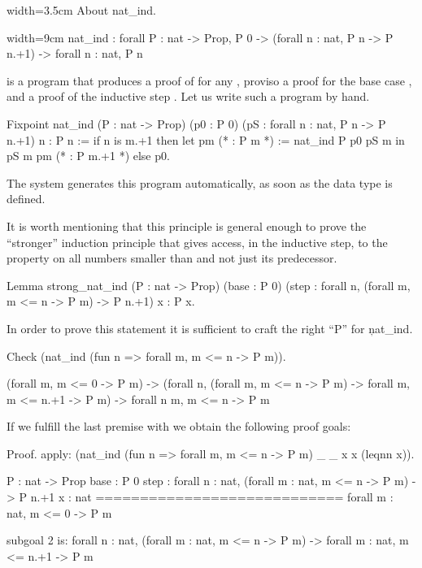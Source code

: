 \begin{coq}{}{width=3.5cm}
About nat_ind.
\end{coq}
\begin{coqout}{}{width=9cm}
nat_ind : forall P : nat -> Prop,
  P 0 -> (forall n : nat, P n -> P n.+1) -> forall n : nat, P n
\end{coqout}
 is a program that produces a proof of  for any ,
proviso a proof for the base case , and a proof
of the inductive step .
Let us write such a program by hand.

\begin{coq}{}{}
Fixpoint nat_ind (P : nat -> Prop)
  (p0 : P 0) (pS : forall n : nat, P n -> P n.+1) n : P n :=
  if n is m.+1 then
    let pm (* : P m *) := nat_ind P p0 pS m in
    pS m pm (* : P m.+1 *)
  else p0.
\end{coq}

The \Coq{} system generates this program automatically, as soon as
 the  data type
is defined. 

It is worth mentioning that this principle is general enough to
prove the ``stronger'' induction principle that gives access, in
the inductive step, to the property  on all numbers
smaller than  and not just its predecessor.

\begin{coq}{}{}
Lemma strong_nat_ind (P : nat -> Prop)
  (base : P 0)
  (step : forall n, (forall m, m <= n -> P m) -> P n.+1) x : P x.
\end{coq}{}{}

In order to prove this statement it is sufficient to craft
the right ``P'' for \c{nat_ind}.

\begin{coq}{}{}
Check (nat_ind (fun n => forall m, m <= n -> P m)).
\end{coq}{}{}
\begin{coqout}{}{}
  (forall m, m <= 0 -> P m) ->
  (forall n, (forall m, m <= n -> P m) -> forall m, m <= n.+1 -> P m) ->
  forall n m, m <= n -> P m
\end{coqout}{}{}

If we fulfill the last premise with  we obtain
the following proof goals:

\begin{coq}{}{}
Proof.
apply: (nat_ind (fun n => forall m, m <= n -> P m) _ _ x x (leqnn x)).
\end{coq}{}{}
\begin{coqout}{}{}
  P : nat -> Prop
  base : P 0
  step : forall n : nat, (forall m : nat, m <= n -> P m) -> P n.+1
  x : nat
  ============================
  forall m : nat, m <= 0 -> P m

subgoal 2 is:
 forall n : nat,
 (forall m : nat, m <= n -> P m) -> forall m : nat, m <= n.+1 -> P m
\end{coqout}{}{}

